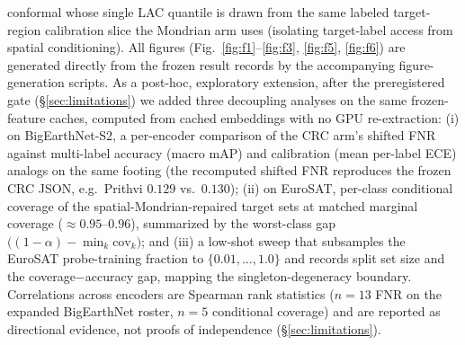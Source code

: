 \documentclass[journal]{IEEEtran}
\renewcommand{\_}{\textunderscore\allowbreak}
\begin{document}
conformal whose single LAC quantile is drawn from the same labeled target-region calibration slice
the Mondrian arm uses (isolating target-label access from spatial conditioning).
All figures (Fig.~\ref{fig:f1}--\ref{fig:f3}, \ref{fig:f5}, \ref{fig:f6}) are generated directly from the
frozen result records by the accompanying figure-generation scripts.
As a post-hoc, exploratory extension, after the preregistered gate
(\S\ref{sec:limitations}) we added three decoupling analyses on the same frozen-feature caches, computed
from cached embeddings with no GPU re-extraction: (i) on BigEarthNet-S2, a per-encoder comparison
of the CRC arm's shifted FNR against multi-label accuracy (macro mAP) and calibration (mean per-label
ECE) analogs on the same footing (the recomputed shifted FNR reproduces the frozen CRC JSON, e.g.\ Prithvi
$0.129$ vs.\ $0.130$); (ii) on EuroSAT, per-class conditional coverage of the spatial-Mondrian-repaired
target sets at matched marginal coverage ($\approx0.95$--$0.96$), summarized by the worst-class gap
$\big((1{-}\alpha)-\min_k \mathrm{cov}_k\big)$; and (iii) a low-shot sweep that subsamples the
EuroSAT probe-training fraction to $\{0.01,\dots,1.0\}$ and records split set size and the
coverage$-$accuracy gap, mapping the singleton-degeneracy boundary. Correlations across encoders are
Spearman rank statistics ($n{=}13$ FNR on the expanded BigEarthNet roster, $n{=}5$ conditional coverage)
and are reported as directional evidence, not proofs of independence (\S\ref{sec:limitations}).
\end{document}
